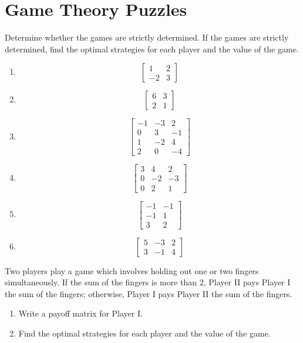 \section{Game Theory Puzzles}

\begin{puzzle}
    Determine whether the games are strictly determined. If the games are strictly determined, find the optimal strategies for each player and the value of the game.
    \begin{enumerate}
        \item \[
                  \begin{bmatrix} 1 & 2 \\ -2 & 3 \end{bmatrix}
              \]
        \item \[
                  \begin{bmatrix} 6 & 3 \\ 2 & 1 \end{bmatrix}
              \]
        \item \[
                  \begin{bmatrix} -1 & -3 & 2 \\ 0 & 3 & -1 \\ 1 & -2 & 4 \\ 2 & 0 & -4 \end{bmatrix}
              \]
        \item \[
                  \begin{bmatrix} 3 & 4 & 2 \\ 0 & -2 & -3 \\ 0 & 2 & 1 \end{bmatrix}
              \]
        \item \[
                  \begin{bmatrix} -1 & -1 \\ -1 & 1 \\ 3 & 2 \end{bmatrix}
              \]
        \item \[
                  \begin{bmatrix} 5 & -3 & 2 \\ 3 & -1 & 4 \end{bmatrix}
              \]

    \end{enumerate}
\end{puzzle}

\begin{puzzle}
    Two players play a game which involves holding out one or two fingers simultaneously. If the sum of the fingers is more than 2, Player II pays Player I the sum of the fingers; otherwise, Player I pays Player II the sum of the fingers.
    \begin{enumerate}
        \item Write a payoff matrix for Player I.
        \item Find the optimal strategies for each player and the value of the game.
    \end{enumerate}
\end{puzzle}

